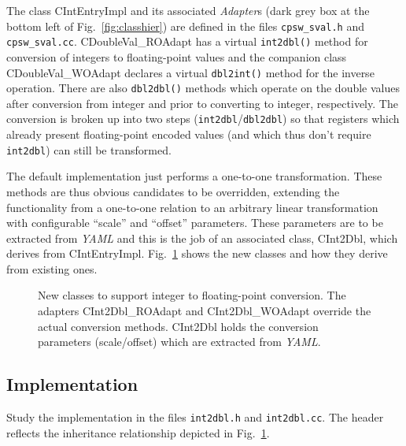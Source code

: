 \documentclass[10pt]{article}
\newcommand{\ita}[1]{\emph{#1}}
\newcommand{\yaml}      {\ita {YAML}}
\newcommand{\cod}[1] {{\tt#1}}
\newcounter{figs}
\newcommand{\fig}[2]{
\refstepcounter{figs}
\hspace*{\fill}\resizebox{#1}{!}{\texttt{[image: \#2]}}\hspace*{\fill}
}
\newcommand{\figr}[1]{Fig.~\ref{fig:#1}}
\begin{document}
The class CIntEntryImpl and its associated {\em Adapter}s (dark grey box
at the bottom left of \figr{classhier})
are defined in the files \cod{cpsw\_sval.h} and \cod{cpsw\_sval.cc}. CDoubleVal\_ROAdapt
has a virtual \cod{int2dbl()} method for conversion of integers to floating-point values and
the companion class CDoubleVal\_WOAdapt declares a virtual \cod{dbl2int()} method for the
inverse operation.  There are also \cod{dbl2dbl()} methods which operate on the double
values after conversion from integer and prior to converting to integer, respectively.
The conversion is broken up into two steps (\cod{int2dbl}/\cod{dbl2dbl}) so that
registers which already present floating-point encoded values (and which thus
don't require \cod{int2dbl}) can still be transformed.

The default implementation just performs a one-to-one transformation. These methods are
thus obvious candidates to be overridden, extending the functionality from a one-to-one
relation to an arbitrary linear transformation with configurable ``scale'' and
``offset'' parameters. These parameters are to be extracted from \yaml{} and this is
the job of an associated class, CInt2Dbl, which derives from CIntEntryImpl.
\figr{int2dbl} shows the new classes and how they derive from existing ones.

\begin{figure}[htb]
\fig{0.9\textwidth}{O.Common/int2dbl.pdf}
\label{fig:int2dbl}
\caption{New classes to support integer to floating-point conversion. The adapters
CInt2Dbl\_ROAdapt and CInt2Dbl\_WOAdapt override the actual conversion methods.
CInt2Dbl holds the conversion parameters (scale/offset) which are extracted
from \yaml{}.}
\end{figure}

\subsection{Implementation}
Study the implementation in the files \cod{int2dbl.h} and \cod{int2dbl.cc}.
The header reflects the inheritance relationship depicted in \figr{int2dbl}.
\end{document}
